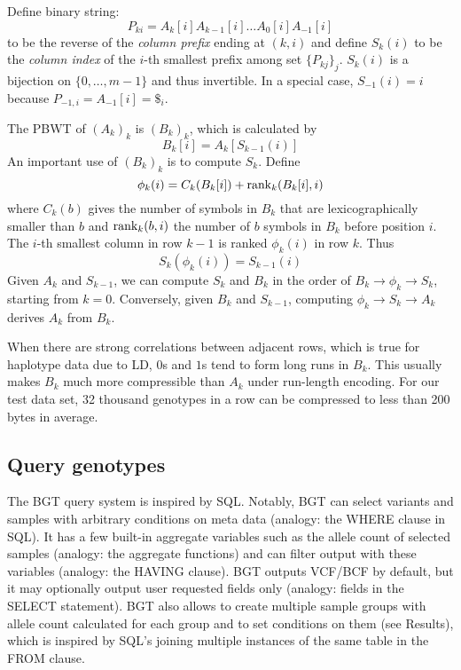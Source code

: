 \documentclass{bioinfo}
\begin{document}
\begin{methods}
Define binary string:
\[
P_{ki}=A_k[i]A_{k-1}[i]\ldots A_0[i]A_{-1}[i]
\]
to be the reverse of the \emph{column prefix} ending at $(k,i)$ and define $S_k(i)$ to
be the \emph{column index} of the $i$-th smallest prefix among set $\{P_{kj}\}_j$.
$S_k(i)$ is a bijection on $\{0,\ldots,m-1\}$ and thus invertible. In a
special case, $S_{-1}(i)=i$ because $P_{-1,i}=A_{-1}[i]=\$_i$.

The PBWT of $(A_k)_k$ is $(B_k)_k$, which is
calculated by
\begin{equation*}\label{eq:B}
B_k[i]=A_k[S_{k-1}(i)]
\end{equation*}
An important use of $(B_k)_k$ is to compute $S_k$. Define
\begin{equation*}\label{eq:phi}
\phi_k(i)=C_k(B_k[i])+{\rm rank}_k(B_k[i],i)
\end{equation*}
where $C_k(b)$ gives the number of symbols in $B_k$ that are lexicographically
smaller than $b$ and ${\rm rank}_k(b,i)$ the number of $b$ symbols in $B_k$
before position $i$. The $i$-th smallest column in row $k-1$ is ranked
$\phi_k(i)$ in row $k$. Thus
\begin{equation*}\label{eq:trans}
S_k(\phi_k(i))=S_{k-1}(i)
\end{equation*}
Given $A_k$ and $S_{k-1}$, we can compute $S_k$ and $B_k$ in the order of
$B_k\to\phi_k\to S_k$, starting from $k=0$. Conversely, given $B_k$ and
$S_{k-1}$, computing $\phi_k\to S_k\to A_k$ derives $A_k$ from $B_k$.

When there are strong correlations between adjacent rows, which is true for
haplotype data due to LD, $0$s and $1$s tend to form long
runs in $B_k$. This usually makes $B_k$ much more compressible than $A_k$ under
run-length encoding. For our test data set, 32 thousand genotypes in a row can
be compressed to less than 200 bytes in average.

\subsection{Query genotypes}

The BGT query system is inspired by SQL.  Notably, BGT can select variants and
samples with arbitrary conditions on meta data (analogy: the {\sf WHERE} clause
in SQL). It has a few built-in aggregate variables such as the allele count of
selected samples (analogy: the aggregate functions) and can filter output with
these variables (analogy: the {\sf HAVING} clause). BGT outputs VCF/BCF by
default, but it may optionally output user requested fields only (analogy:
fields in the {\sf SELECT} statement). BGT also allows to create multiple
sample groups with allele count calculated for each group and to set conditions
on them (see Results), which is inspired by SQL's joining multiple instances of
the same table in the {\sf FROM} clause.


\end{methods}
\end{document}
